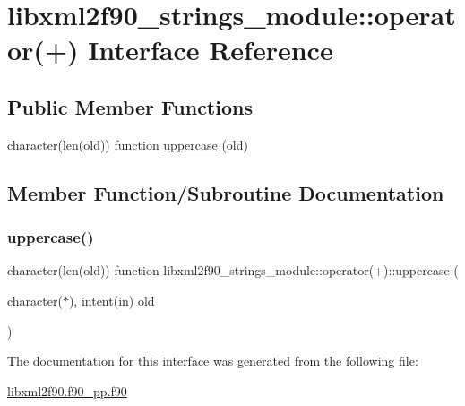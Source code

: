 \hypertarget{interfacelibxml2f90__strings__module_1_1operator_07_09_08}{}\section{libxml2f90\+\_\+strings\+\_\+module\+:\+:operator(+) Interface Reference}
\label{interfacelibxml2f90__strings__module_1_1operator_07_09_08}
\subsection*{Public Member Functions}
\begin{DoxyCompactItemize}
\item 
character(len(old)) function \hyperlink{interfacelibxml2f90__strings__module_1_1operator_07_09_08_ac098da20c920dfd5e8445ec61cdc20dc}{uppercase} (old)
\end{DoxyCompactItemize}


\subsection{Member Function/\+Subroutine Documentation}
\mbox{\label{interfacelibxml2f90__strings__module_1_1operator_07_09_08_ac098da20c920dfd5e8445ec61cdc20dc}} 
\subsubsection{\texorpdfstring{uppercase()}{uppercase()}}
{\footnotesize\ttfamily character(len(old)) function libxml2f90\+\_\+strings\+\_\+module\+::operator(+)\+::uppercase (\begin{DoxyParamCaption}\item[{character($\ast$), intent(in)}]{old }\end{DoxyParamCaption})}



The documentation for this interface was generated from the following file\+:\begin{DoxyCompactItemize}
\item 
\hyperlink{libxml2f90_8f90__pp_8f90}{libxml2f90.\+f90\+\_\+pp.\+f90}\end{DoxyCompactItemize}
